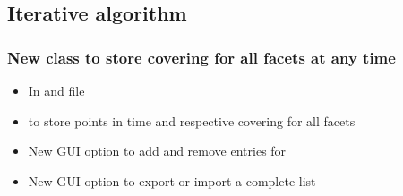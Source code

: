 \subsection{Iterative algorithm}
\subsubsection{New class to store covering for all facets at any time} 
\begin{itemize}[noitemsep,topsep=0pt]
\item In  and  file
\item {} to store points in time and respective covering for all facets
\item New GUI option to add and remove entries for 
\item New GUI option to export or import a complete list
\end{itemize}

